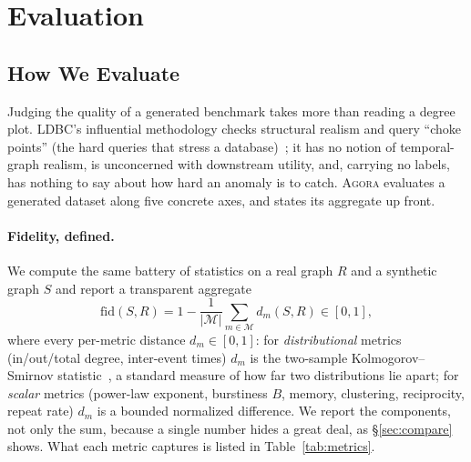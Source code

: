 \documentclass[sigconf,review,anonymous]{acmart}
\newcommand{\sys}{\textsc{Agora}\xspace}
\begin{document}
\section{Evaluation}
\label{sec:evaluation}

\subsection{How We Evaluate}
\label{sec:eval}
Judging the quality of a generated benchmark takes more than reading a degree plot.
LDBC's influential methodology checks structural realism and query ``choke points''
(the hard queries that stress a database)~\cite{boncz2013tpch,erling2015ldbc}; it has
no notion of temporal-graph realism, is unconcerned with downstream utility, and,
carrying no labels, has nothing to say about how hard an anomaly is to catch. \sys{}
evaluates a generated dataset along five concrete axes, and states its aggregate up
front.

\paragraph{Fidelity, defined.}
We compute the same battery of statistics on a real graph $R$ and a synthetic graph
$S$ and report a transparent aggregate
\begin{equation}
\mathrm{fid}(S,R)=1-\frac{1}{|\mathcal{M}|}\sum_{m\in\mathcal{M}} d_m(S,R)\in[0,1],\label{eq:fid}
\end{equation}
where every per-metric distance $d_m\in[0,1]$: for \emph{distributional} metrics
(in/out/total degree, inter-event times) $d_m$ is the two-sample Kolmogorov--Smirnov
statistic~\cite{massey1951ks}, a standard measure of how far two distributions lie
apart; for \emph{scalar} metrics (power-law exponent, burstiness $B$, memory,
clustering, reciprocity, repeat rate) $d_m$ is a bounded normalized difference. We
report the components, not only the sum, because a single number hides a great deal, as
\S\ref{sec:compare} shows. What each metric captures is listed in
Table~\ref{tab:metrics}.
\end{document}
